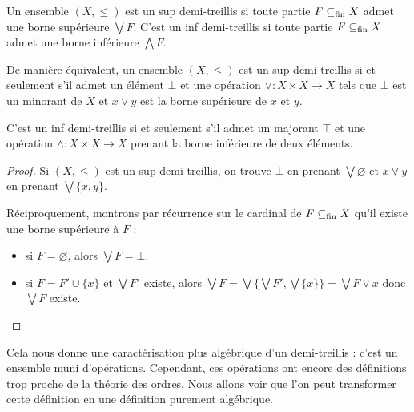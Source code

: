 \begin{definition}
  Un ensemble $(X,\leq)$ est un sup demi-treillis si toute partie $F\subseteq_{\mathrm{fin}} X$
  admet une borne supérieure $\bigvee F$. C'est un inf demi-treillis si toute
  partie $F\subseteq_{\mathrm{fin}} X$ admet une borne inférieure $\bigwedge F$.
\end{definition}

\begin{property}
  De manière équivalent, un ensemble $(X,\leq)$ est un sup demi-treillis si et
  seulement s'il admet un élément $\bot$ et une opération
  $\lor : X \times X \to X$ tels que $\bot$ est un minorant de $X$ et
  $x\lor y$ est la borne supérieure de $x$ et $y$.

  C'est un inf demi-treillis si et seulement s'il admet un majorant $\top$ et
  une opération $\land : X \times X \to X$ prenant la borne inférieure de deux
  éléments.
\end{property}

\begin{proof}
  Si $(X,\leq)$ est un sup demi-treillis, on trouve $\bot$ en prenant
  $\bigvee\varnothing$ et $x\lor y$ en prenant $\bigvee\{x,y\}$.

  Réciproquement, montrons par récurrence sur le cardinal de $F\subseteq_{\mathrm{fin}} X$ qu'il
  existe une borne supérieure à $F$ :
  \begin{itemize}
  \item si $F = \varnothing$, alors $\bigvee F = \bot$.
  \item si $F = F' \cup \{x\}$ et $\bigvee F'$ existe, alors
    $\bigvee F = \bigvee \{\bigvee F',\bigvee \{x\}\} = \bigvee F \lor x$
    donc $\bigvee F$ existe.
  \end{itemize}
\end{proof}

Cela nous donne une caractérisation plus algébrique d'un demi-treillis : c'est
un ensemble muni d'opérations. Cependant, ces opérations ont encore des
définitions trop proche de la théorie des ordres. Nous allons voir que l'on peut
transformer cette définition en une définition purement algébrique.

